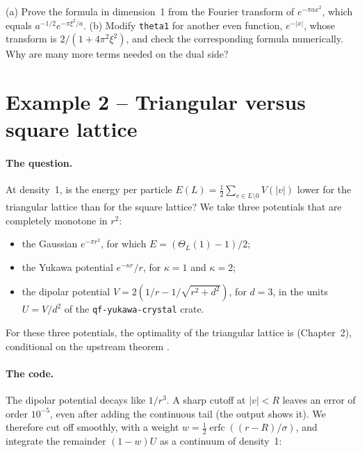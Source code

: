 \begin{exercise}[Example 1]\label{appF:exo1}
(a) Prove the formula in dimension~1 from the Fourier transform of $e^{-\pi ax^2}$, which equals
$a^{-1/2}e^{-\pi\xi^2/a}$. (b) Modify \texttt{theta1} for another even function, $e^{-|x|}$, whose transform is
$2/(1+4\pi^2\xi^2)$, and check the corresponding formula numerically. Why are many more terms needed on the dual side?
\end{exercise}

\section{Example 2 -- Triangular versus square lattice}\label{appF:ex2}

\paragraph{The question.} At density~1, is the energy per particle $E(L)=\tfrac12\sum_{v\in L\setminus0}V(|v|)$ lower
for the triangular lattice than for the square lattice? We take three potentials that are completely monotone in $r^2$:
\begin{itemize}
\item the Gaussian $e^{-\pi r^2}$, for which $E=(\Theta_L(1)-1)/2$;
\item the Yukawa potential $e^{-\kappa r}/r$, for $\kappa=1$ and $\kappa=2$;
\item the dipolar potential $V=2(1/r-1/\sqrt{r^2+d^2})$, for $d=3$, in the units $U=V/d^2$ of the
\texttt{qf-yukawa-crystal} crate.
\end{itemize}
For these three potentials, the optimality of the triangular lattice is \tierA{} (Chapter~2), conditional on the
upstream theorem .

\paragraph{The code.} The dipolar potential decays like $1/r^3$. A sharp cutoff at $|v|<R$ leaves an error of order
$10^{-5}$, even after adding the continuous tail (the output shows it). We therefore cut off smoothly, with a weight
$w=\tfrac12\operatorname{erfc}((r-R)/\sigma)$, and integrate the remainder $(1-w)U$ as a continuum of density~1:


